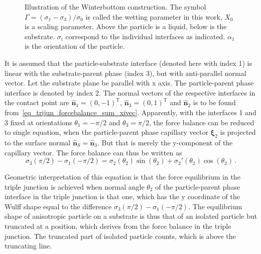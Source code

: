 \begin{figure}
	\caption{Illustration of the Winterbottom construction. The symbol $\Gamma = (\sigma_1-\sigma_3)/\sigma_0$ is called the wetting parameter in this work, $X_0$ is a scaling parameter. Above the particle is a liquid, below is the substrate. $\sigma_i$ correspond to the individual interfaces as indicated. $\alpha_1$ is the orientation of the particle.}
	\label{fig_winterbottom_explained_intro}
\end{figure}

 It is assumed that the particle-substrate interface (denoted here with index 1) is linear with the substrate-parent phase (index 3), but with anti-parallel normal vector. Let the substrate plane be parallel with x axis. The particle-parent phase interface is denoted by index 2. The normal vectors of the respective interfaces in the contact point are $\hat{\bm{n}}_1=(0,-1)^{\mathrm{T}}$, $\hat{\bm{n}}_3=(0,1)^{\mathrm{T}}$ and $\hat{\bm{n}}_2$ is to be found from~\eqref{eq_trijun_forcebalance_sum_xivec}. Apparently, with the interfaces 1 and 3 fixed at orientations $\theta_1=-\pi/2$ and $\theta_3=\pi/2$, the force balance can be reduced to single equation, when the particle-parent phase capillary vector $\bm{\xi}_2$ is projected to the surface normal $\hat{\bm{n}}_S=\hat{\bm{n}}_3$. But that is merely the y-component of the capillary vector. The force balance can thus be written as
\begin{equation}\label{eq_youngs_eq_aniso}
    \sigma_{3}(\pi/2)-\sigma_1(-\pi/2)  
      = \sigma_2(\theta_2)\sin(\theta_2) + \sigma_2'(\theta_2)\cos(\theta_2) \,.
\end{equation}

Geometric interpretation of this equation is that the force equilibrium in the triple junction is achieved when normal angle $\theta_2$ of the particle-parent phase interface in the triple junction is that one, which has the y coordinate of the Wulff shape equal to the difference $\sigma_{3}(\pi/2)-\sigma_1(-\pi/2) $. The equilibrium shape of anisotropic particle on a substrate is thus that of an isolated particle but truncated at a position, which derives from the force balance in the triple junction. The truncated part of isolated particle counts, which is above the truncating line.

